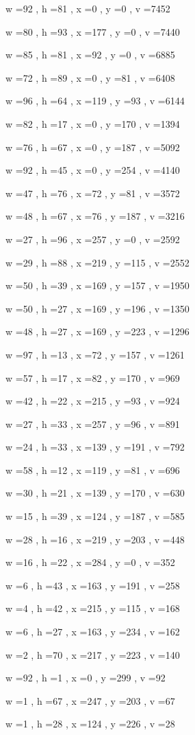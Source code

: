 \documentclass[11pt]{article}
\begin{document}
w =92 , h =81 , x =0 , y =0 , v =7452
\par
w =80 , h =93 , x =177 , y =0 , v =7440
\par
w =85 , h =81 , x =92 , y =0 , v =6885
\par
w =72 , h =89 , x =0 , y =81 , v =6408
\par
w =96 , h =64 , x =119 , y =93 , v =6144
\par
w =82 , h =17 , x =0 , y =170 , v =1394
\par
w =76 , h =67 , x =0 , y =187 , v =5092
\par
w =92 , h =45 , x =0 , y =254 , v =4140
\par
w =47 , h =76 , x =72 , y =81 , v =3572
\par
w =48 , h =67 , x =76 , y =187 , v =3216
\par
w =27 , h =96 , x =257 , y =0 , v =2592
\par
w =29 , h =88 , x =219 , y =115 , v =2552
\par
w =50 , h =39 , x =169 , y =157 , v =1950
\par
w =50 , h =27 , x =169 , y =196 , v =1350
\par
w =48 , h =27 , x =169 , y =223 , v =1296
\par
w =97 , h =13 , x =72 , y =157 , v =1261
\par
w =57 , h =17 , x =82 , y =170 , v =969
\par
w =42 , h =22 , x =215 , y =93 , v =924
\par
w =27 , h =33 , x =257 , y =96 , v =891
\par
w =24 , h =33 , x =139 , y =191 , v =792
\par
w =58 , h =12 , x =119 , y =81 , v =696
\par
w =30 , h =21 , x =139 , y =170 , v =630
\par
w =15 , h =39 , x =124 , y =187 , v =585
\par
w =28 , h =16 , x =219 , y =203 , v =448
\par
w =16 , h =22 , x =284 , y =0 , v =352
\par
w =6 , h =43 , x =163 , y =191 , v =258
\par
w =4 , h =42 , x =215 , y =115 , v =168
\par
w =6 , h =27 , x =163 , y =234 , v =162
\par
w =2 , h =70 , x =217 , y =223 , v =140
\par
w =92 , h =1 , x =0 , y =299 , v =92
\par
w =1 , h =67 , x =247 , y =203 , v =67
\par
w =1 , h =28 , x =124 , y =226 , v =28
\par
\newpage
\end{document}
